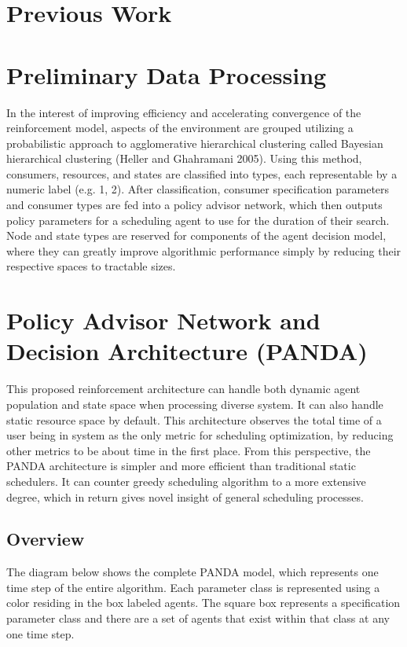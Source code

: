 \documentclass{article}
\theoremstyle{definition}
\theoremstyle{remark}
\begin{document}
	\section{Previous Work}
	
	\section{Preliminary Data Processing}
	
	In the interest of improving efficiency and accelerating convergence of the reinforcement model, aspects of the environment are grouped utilizing a probabilistic approach to agglomerative hierarchical clustering called Bayesian hierarchical clustering (Heller and Ghahramani 2005). Using this method, consumers, resources, and states are classified into types, each representable by a numeric label (e.g. 1, 2). After classification, consumer specification parameters and consumer types are fed into a policy advisor network, which then outputs policy parameters for a scheduling agent to use for the duration of their search. Node and state types are reserved for components of the agent decision model, where they can greatly improve algorithmic performance simply by reducing their respective spaces to tractable sizes.

	\section{Policy Advisor Network and Decision Architecture (PANDA)}

	This proposed reinforcement architecture can handle both dynamic agent population and state space when processing diverse system. It can also handle static resource space by default. This architecture observes the total time of a user being in system as the only metric for scheduling optimization, by reducing other metrics to be about time in the first place. From this perspective, the PANDA architecture is simpler and more efficient than traditional static schedulers. It can counter greedy scheduling algorithm to a more extensive degree, which in return gives novel insight of general scheduling processes.

		\subsection{Overview}

		The diagram below shows the complete PANDA model, which represents one time step of the entire algorithm. Each parameter class is represented using a color residing in the box labeled agents. The square box represents a specification parameter class and there are a set of agents that exist within that class at any one time step.
\end{document}
